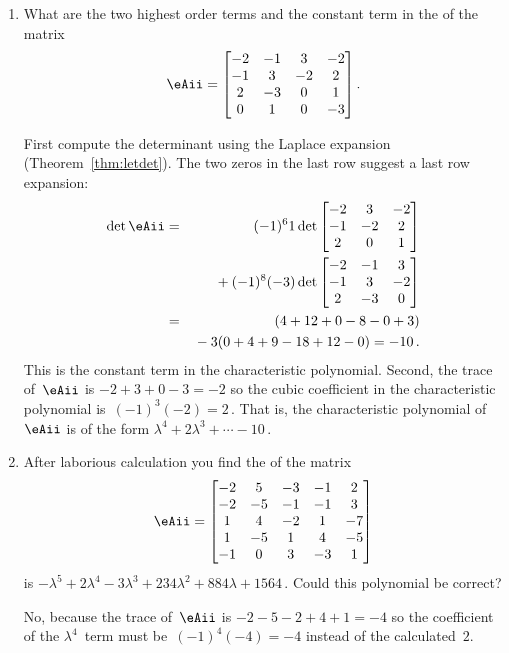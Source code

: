 \begin{example} \label{eg:}
\begin{enumerate}
\item What are the two highest order terms and the constant term in the  of the matrix
\begin{equation*}
\eAii=\begin{bmatrix}-2&-1&3&-2
\\-1&3&-2&2
\\2&-3&0&1
\\0&1&0&-3  \end{bmatrix}.
\end{equation*}
\begin{solution} 
First compute the determinant using the Laplace expansion (Theorem~\ref{thm:letdet}).  
The two zeros in the last row suggest a last row expansion:
\begin{eqnarray*}
\det \eAii&=&(-1)^61\det\begin{bmatrix}-2&3&-2
\\-1&-2&2
\\2&0&1 \end{bmatrix}
\\&&{}
+(-1)^8(-3)\det\begin{bmatrix}-2&-1&3
\\-1&3&-2
\\2&-3&0\end{bmatrix}
\\&=&(4+12+0-8-0+3)
\\&&{}-3(0+4+9-18+12-0)
=-10\,.
\end{eqnarray*}
This is the constant term in the characteristic polynomial.
Second, the trace of~\(\eAii\) is \(-2+3+0-3=-2\) so the cubic coefficient in the characteristic polynomial is~\((-1)^3(-2)=2\)\,.
That is, the characteristic polynomial of~\(\eAii\) is of the form \(\lambda^4+2\lambda^3+\cdots-10\)\,.
\end{solution}

\item After laborious calculation you find the  of the matrix
\begin{equation*}
\eAii=\begin{bmatrix}-2&5&-3&-1&2
\\-2&-5&-1&-1&3
\\1&4&-2&1&-7
\\1&-5&1&4&-5
\\-1&0&3&-3&1\end{bmatrix}
\end{equation*}
is \(-\lambda^5+2\lambda^4-3\lambda^3+234\lambda^2+884\lambda+1564\)\,.  
Could this polynomial be correct?
\begin{solution} 
No, because the trace of~\(\eAii\) is \(-2-5-2+4+1=-4\) so the coefficient of the \(\lambda^4\)~term must be~\((-1)^4(-4)=-4\) instead of the calculated~\(2\).
\end{solution}


\end{enumerate}
\end{example}
